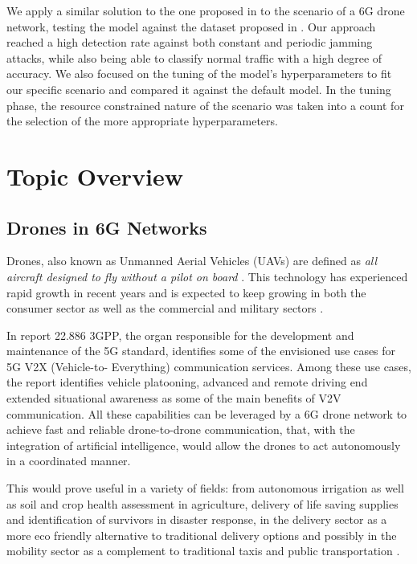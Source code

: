 \documentclass[futureinternet,article,submit,pdftex,moreauthors]{Definitions/mdpi}
\begin{document}
We apply a similar solution to the one proposed in \cite{HybridJammingDetection-Hong} to the scenario of a 6G drone network, testing the model against the dataset proposed in \cite{JammingDetectionIoT-Hussain}.
Our approach reached a high detection rate against both constant and periodic jamming attacks, while also being able to classify normal traffic with a high degree of accuracy. We also focused on the tuning of the model's hyperparameters to fit our specific scenario and compared it 
against the default model. In the tuning phase, the resource constrained nature of the scenario was taken into a count for the selection of the more appropriate hyperparameters.

\section{Topic Overview}

\subsection{Drones in 6G Networks}

Drones, also known as Unmanned Aerial Vehicles (UAVs) are defined as \textit{all aircraft designed to fly
without a pilot on board} \cite{DronesEC}. This technology has experienced rapid growth in recent years and is expected to 
keep growing in both the consumer sector as well as the commercial and military sectors \cite{DronesStatisticsLaricchia}.

In report 22.886 \cite{5GV2XSultan} 3GPP, the organ responsible for the development and maintenance of the 5G standard, identifies some of the envisioned use cases for 5G V2X (Vehicle-to-
Everything) communication services. Among these use cases, the report identifies vehicle platooning, advanced and remote driving end extended situational awareness as some of the main benefits
of V2V communication. All these capabilities can be leveraged by a 6G drone network to achieve fast and reliable drone-to-drone communication, that, with the integration of artificial intelligence, 
would allow the drones to act autonomously in a coordinated manner. 

This would prove useful in a variety of fields: from autonomous irrigation as well as soil and crop health assessment in agriculture, 
delivery of life saving supplies and identification of survivors in disaster response, in the delivery sector as a more eco friendly alternative to traditional 
delivery options and possibly in the mobility sector as a complement to traditional taxis and public transportation \cite{DroneCommHassija}. 
\end{document}
